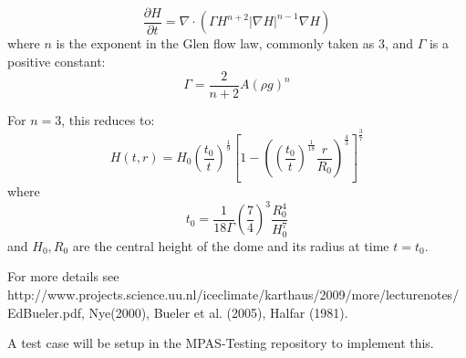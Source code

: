 \documentclass[11pt]{report}
\begin{document}
\begin{equation}
    \label{halfar}
    \frac{\partial H}{\partial t} = \nabla \cdot (\Gamma H^{n+2} |\nabla H|^{n-1} \nabla H)
\end{equation}
where $n$ is the exponent in the Glen flow law, commonly taken as 3, and $\Gamma$ is a positive constant:
\begin{equation}
    \Gamma = \frac{2}{n+2} A (\rho g)^n
\end{equation}

For $n=3$, this reduces to:
\begin{equation}
    H(t,r) = H_0 \left(\frac{t_0}{t}\right)^\frac{1}{9}  \left[ 1 - \left(  \left( \frac{t_0}{t} \right) ^ \frac{1}{18} \frac{r}{R_0} \right)^\frac{4}{3} \right] ^ \frac{3}{7}
\end{equation}
where
\begin{equation}
    t_0 = \frac{1}{18\Gamma} \left( \frac{7}{4} \right)^3 \frac{R_0^4}{H_0^7}
\end{equation}
and $H_0, R_0$ are the central height of the dome and its radius at time $t=t_0$.

For more details see http://www.projects.science.uu.nl/iceclimate/karthaus/2009/more/lecturenotes/EdBueler.pdf,  Nye(2000), Bueler et al. (2005), Halfar (1981).

A test case will be setup in the MPAS-Testing repository to implement this.

\end{document}
